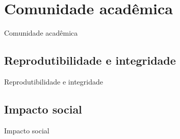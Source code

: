\section{Comunidade acadêmica}
\label{s.community}

\begin{frame}{Comunidade acadêmica}
\end{frame}

\subsection{Reprodutibilidade e integridade}
\label{ss.reproducibility_integrity}

\begin{frame}{Reprodutibilidade e integridade}
\end{frame}

\subsection{Impacto social}
\label{ss.social_impact}

\begin{frame}{Impacto social}
\end{frame}
